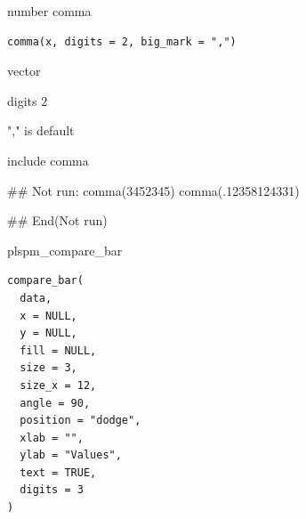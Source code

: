 \documentclass[a4paper]{book}
\begin{document}
%
\begin{Description}
number comma
\end{Description}
%
\begin{Usage}
\begin{verbatim}
comma(x, digits = 2, big_mark = ",")
\end{verbatim}
\end{Usage}
%
\begin{Arguments}
\begin{ldescription}
\item[\code{x}] vector

\item[\code{digits}] digits 2

\item[\code{big\_mark}] "," is default
\end{ldescription}
\end{Arguments}
%
\begin{Value}
include comma
\end{Value}
%
\begin{Examples}
\begin{ExampleCode}

\#\# Not run: 
comma(3452345)
comma(.12358124331)

## End(Not run)
\end{ExampleCode}
\end{Examples}
%
\begin{Description}
plspm\_compare\_bar
\end{Description}
%
\begin{Usage}
\begin{verbatim}
compare_bar(
  data,
  x = NULL,
  y = NULL,
  fill = NULL,
  size = 3,
  size_x = 12,
  angle = 90,
  position = "dodge",
  xlab = "",
  ylab = "Values",
  text = TRUE,
  digits = 3
)
\end{verbatim}
\end{Usage}
%
\end{document}
